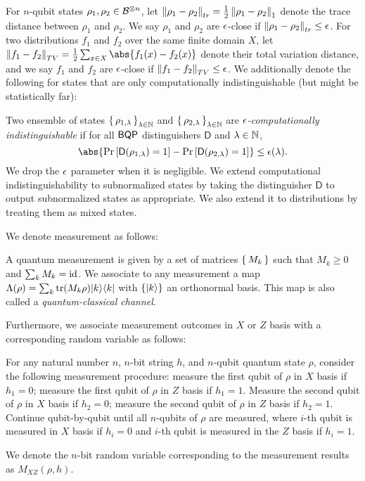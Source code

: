 For $n$-qubit states $\rho_1, \rho_2\in\mathcal{B}^{\otimes n}$,
let $\left\lVert\rho_1-\rho_2\right\rVert_{tr}=\frac{1}{2}\left\lVert\rho_1-\rho_2\right\rVert_1$ denote the trace distance between $\rho_1$ and $\rho_2$. We say $\rho_1$ and $\rho_2$ are $\epsilon$-close if $\left\lVert\rho_1- \rho_2\right\rVert_{tr}\leq\epsilon$.
For two distributions $f_1$ and $f_2$ over the same finite domain $X$, let $\norm{f_1-f_2}_{TV}=\frac{1}{2}\sum_{x\in X}\abs{f_1(x)-f_2(x)}$ denote their total variation distance,
and we say $f_1$ and $f_2$ are $\epsilon$-close if $\left\lVert f_1-f_2\right\rVert_{TV}\leq\epsilon$.
We additionally denote the following for states that are only computationally indistinguishable (but might be statistically far):
\begin{definition}
\label{def:comp-indis}
    Two ensemble of states $\set{\rho_{1,\lambda}}_{\lambda\in\mathbb{N}}$ and $\set{\rho_{2,\lambda}}_{\lambda\in\mathbb{N}}$ are \emph{$\epsilon$-computationally indistinguishable} if for all $\operatorname{\mathsf{BQP}}$ distinguishers $\mathsf{D}$ and $\lambda\in\mathbb{N}$,
    $$\abs{\Pr\left[\mathsf{D}(\rho_{1,\lambda})=1\right]-\Pr\left[\mathsf{D}(\rho_{2,\lambda})=1\right]}\leq\eps(\lambda).$$
    We drop the $\epsilon$ parameter when it is negligible.
    We extend computational indistinguishability to subnormalized states by taking the distinguisher $\mathsf{D}$ to output subnormalized states as appropriate.
    We also extend it to distributions by treating them as mixed states.
\end{definition}

We denote measurement as follows:
\begin{definition} 
    \label{def:QCChannel}
    A quantum measurement is given by a set of matrices $\set{M_k}$ such that $M_k\geq0$ and $\sum_k M_k=\operatorname{id}$.
    We associate to any measurement a map $\Lambda(\rho)=\sum_k \operatorname{tr}(M_k\rho)|k\rangle\langle k|$
    with $\{\ket{k}\}$ an orthonormal basis.
    This map is also called a \emph{quantum-classical channel}.
\end{definition}
Furthermore, we associate measurement outcomes in $X$ or $Z$ basis with a corresponding random variable as follows:
\begin{definition}[$M_{XZ}(\rho,h)$]
	For any natural number $n$, $n$-bit string $h$, and $n$-qubit quantum state $\rho$, consider the following measurement procedure: measure the first qubit of $\rho$ in $X$ basis if $h_1=0$; measure the first qubit of $\rho$ in $Z$ basis if $h_1=1$.  Measure the second qubit of $\rho$ in $X$ basis if $h_2=0$; measure the second qubit of $\rho$ in $Z$ basis if $h_2=1$. Continue qubit-by-qubit until all $n$-qubits of $\rho$ are measured, where $i$-th qubit is measured in $X$ basis if $h_i=0$ and  $i$-th qubit is measured in the $Z$ basis if $h_i=1$.

	We denote the $n$-bit random variable corresponding to the measurement results as $M_{XZ}(\rho,h)$.
\end{definition}


